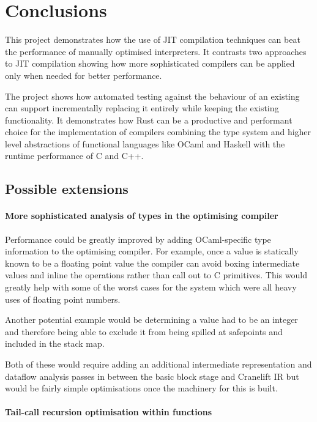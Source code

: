 \chapter{Conclusions}

This project demonstrates how the use of JIT compilation techniques can beat the performance
of manually optimised interpreters. It contrasts two approaches to JIT compilation showing how
more sophisticated compilers can be applied only when needed for better performance.

The project shows how automated testing against the behaviour of an existing can support
incrementally replacing it entirely while keeping the existing functionality.  It demonstrates how
Rust can be a productive and performant choice for the implementation of compilers combining the
type system and higher level abstractions of functional languages like OCaml and Haskell with the
runtime performance of C and C++.

\section{Possible extensions}

\subsubsection{More sophisticated analysis of types in the optimising compiler}

Performance could be greatly improved by adding OCaml-specific type information to the optimising
compiler. For example, once a value is statically known to be a floating point value the compiler
can avoid boxing intermediate values and inline the operations rather than call out to C
primitives.
This would greatly help with some of the worst cases for the system which were all heavy uses of
floating point numbers.

Another potential example would be determining a value had to be an integer and therefore being
able to exclude it
from being spilled at safepoints and included in the stack map.

Both of these would require adding an additional intermediate representation and dataflow analysis
passes in between the basic block stage and Cranelift IR but would be fairly simple optimisations
once
the machinery for this is built.

\subsubsection{Tail-call recursion optimisation within functions}

